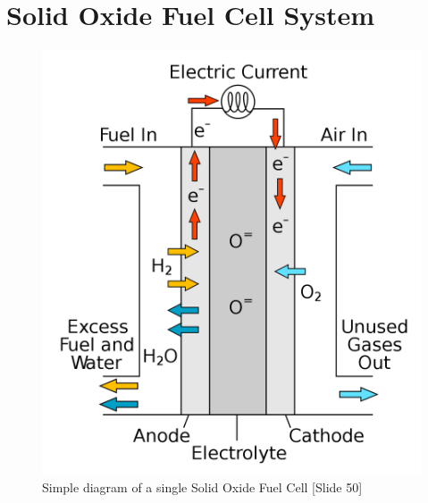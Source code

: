 

%

\section{Solid Oxide Fuel Cell System}

   \begin{figure}[htb]
        \centering
        \includegraphics[scale=0.25]{1200px-Solid_oxide_fuel_cell.png}
        \caption{Simple diagram of a single Solid Oxide Fuel Cell [Slide 50]}
        \label{fig:SOFCbasic}
    \end{figure}
    

